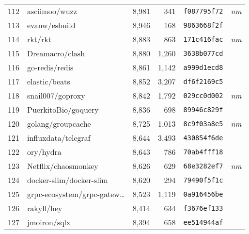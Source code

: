 {\begin{supertabular}{llrrll}
        112 &                      asciimoo/wuzz &  8,981 &    341 &  \texttt{f087795f72} &  \textit{nm} \\
        113 &                      evanw/esbuild &  8,946 &    168 &  \texttt{9863668f2f} &              \\
        114 &                            rkt/rkt &  8,883 &    863 &  \texttt{171c416fac} &  \textit{nm} \\
        115 &                    Dreamacro/clash &  8,880 &  1,260 &  \texttt{3638b077cd} &              \\
        116 &                     go-redis/redis &  8,861 &  1,142 &  \texttt{a999d1ecd8} &              \\
        117 &                      elastic/beats &  8,852 &  3,207 &  \texttt{df6f2169c5} &              \\
        118 &                   snail007/goproxy &  8,842 &  1,792 &  \texttt{029cc0d002} &  \textit{nm} \\
        119 &                PuerkitoBio/goquery &  8,836 &    698 &  \texttt{89946c829f} &              \\
        120 &                  golang/groupcache &  8,725 &  1,013 &  \texttt{8c9f03a8e5} &  \textit{nm} \\
        121 &                influxdata/telegraf &  8,644 &  3,493 &  \texttt{430854f6de} &              \\
        122 &                          ory/hydra &  8,643 &    786 &  \texttt{70ab4fff18} &              \\
        123 &                Netflix/chaosmonkey &  8,626 &    629 &  \texttt{68e3282ef7} &  \textit{nm} \\
        124 &            docker-slim/docker-slim &  8,620 &    294 &  \texttt{79490f5f1c} &              \\
        125 &    grpc-ecosystem/grpc-gatew\ldots &  8,523 &  1,119 &  \texttt{0a916456be} &              \\
        126 &                         rakyll/hey &  8,414 &    634 &  \texttt{f3676ef133} &              \\
        127 &                       jmoiron/sqlx &  8,394 &    658 &  \texttt{ee514944af} &              \\

\end{supertabular}}
